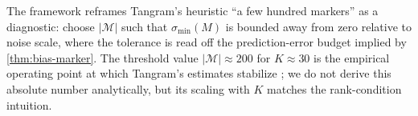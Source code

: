 The framework reframes Tangram's heuristic ``a few hundred markers''
as a diagnostic: choose $|\mathcal{M}|$ such that
$\sigma_{\min}(M)$ is bounded away from zero relative to noise
scale, where the tolerance is read off the prediction-error budget
implied by \cref{thm:bias-marker}. The threshold value
$|\mathcal{M}| \approx 200$ for $K \approx 30$ is the empirical
operating point at which Tangram's estimates stabilize
\citep{biancalani2021deep}; we do not derive this absolute number
analytically, but its scaling with $K$ matches the rank-condition
intuition.
